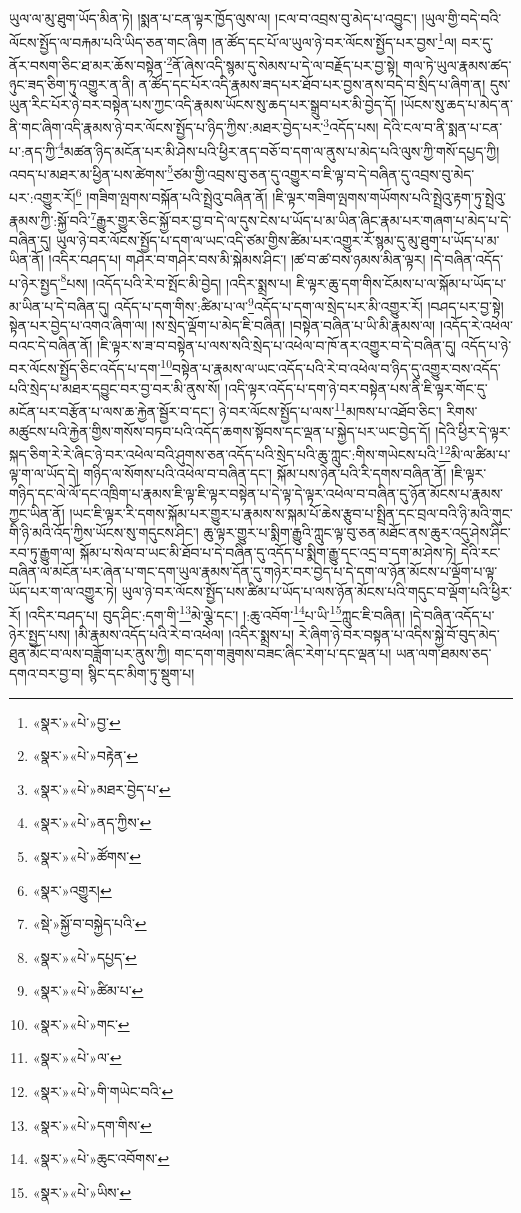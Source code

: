 ཡུལ་ལ་མུ་ཐུག་ཡོད་མིན་ཏེ། །སྨན་པ་ངན་ལྟར་ཁྱོད་ལུས་ལ། །ངལ་བ་འབྲས་བུ་མེད་པ་འབྱུང་། །ཡུལ་གྱི་བདེ་བའི་ལོངས་སྤྱོད་ལ་བརྐམ་པའི་ཡིད་ཅན་གང་ཞིག །ན་ཚོད་དང་པོ་ལ་ཡུལ་ཉེ་བར་ལོངས་སྤྱོད་པར་བྱས་\footnote{«སྣར་»«པེ་»བྱ་}ལ། བར་དུ་ནོར་བསག་ཅིང་ཐ་མར་ཆོས་བསྟེན་\footnote{«སྣར་»«པེ་»བརྟེན་}ནོ་ཞེས་འདི་སྙམ་དུ་སེམས་པ་དེ་ལ་བརྗོད་པར་བྱ་སྟེ། གལ་ཏེ་ཡུལ་རྣམས་ཚད་ཉུང་ཟད་ཅིག་ཏུ་འགྱུར་ན་ནི། ན་ཚོད་དང་པོར་འདི་རྣམས་ཟད་པར་ཐོབ་པར་བྱས་ནས་བདེ་བ་སྲིད་པ་ཞིག་ན། དུས་ཡུན་རིང་པོར་ཉེ་བར་བསྟེན་པས་ཀྱང་འདི་རྣམས་ཡོངས་སུ་ཆད་པར་སྒྲུབ་པར་མི་བྱེད་དོ། །ཡོངས་སུ་ཆད་པ་མེད་ན་ནི་གང་ཞིག་འདི་རྣམས་ཉེ་བར་ལོངས་སྤྱོད་པ་ཉིད་ཀྱིས་:མཐར་བྱེད་པར་\footnote{«སྣར་»«པེ་»མཐར་བྱེད་པ་}འདོད་པས། དེའི་ངལ་བ་ནི་སྨན་པ་ངན་པ་:ནད་ཀྱི་\footnote{«སྣར་»«པེ་»ནད་ཀྱིས་}མཚན་ཉིད་མངོན་པར་མི་ཤེས་པའི་ཕྱིར་ནད་བཅོ་བ་དག་ལ་ནུས་པ་མེད་པའི་ལུས་ཀྱི་གསོ་དཔྱད་ཀྱི། འབད་པ་མཐར་མ་ཕྱིན་པས་ཚེགས་\footnote{«སྣར་»«པེ་»ཚོགས་}ཙམ་གྱི་འབྲས་བུ་ཅན་དུ་འགྱུར་བ་ཇི་ལྟ་བ་དེ་བཞིན་དུ་འབྲས་བུ་མེད་པར་:འགྱུར་རོ།\footnote{«སྣར་»འགྱུར།} །གཟིག་ལྤགས་བསྐོན་པའི་སྤྲེའུ་བཞིན་ནོ། །ཇི་ལྟར་གཟིག་ལྤགས་གཡོགས་པའི་སྤྲེའུ་རྟག་ཏུ་སྤྲེའུ་རྣམས་ཀྱི་:སྐྱོ་བའི་\footnote{«སྡེ་»སྐྱོ་བ་བསྐྱེད་པའི་}རྒྱུར་གྱུར་ཅིང་སྐྱོ་བར་བྱ་བ་དེ་ལ་དུས་ངེས་པ་ཡོད་པ་མ་ཡིན་ཞིང་རྣམ་པར་གཞག་པ་མེད་པ་དེ་བཞིན་དུ། ཡུལ་ཉེ་བར་ལོངས་སྤྱོད་པ་དག་ལ་ཡང་འདི་ཙམ་གྱིས་ཚིམ་པར་འགྱུར་རོ་སྙམ་དུ་མུ་ཐུག་པ་ཡོད་པ་མ་ཡིན་ནོ། །འདིར་བཤད་པ། གཤེར་བ་གཤེར་བས་མི་སྐེམས་ཤིང་། །ཚ་བ་ཚ་བས་ཉམས་མིན་ལྟར། །དེ་བཞིན་འདོད་པ་ཉེར་སྤྱད་\footnote{«སྣར་»«པེ་»དཔྱད་}པས། །འདོད་པའི་རེ་བ་སྤོང་མི་བྱེད། །འདིར་སྨྲས་པ། ཇི་ལྟར་ཆུ་དག་གིས་ངོམས་པ་ལ་སྐོམ་པ་ཡོད་པ་མ་ཡིན་པ་དེ་བཞིན་དུ། འདོད་པ་དག་གིས་:ཚིམ་པ་ལ་\footnote{«སྣར་»«པེ་»ཚིམ་པ་}འདོད་པ་དག་ལ་སྲེད་པར་མི་འགྱུར་རོ། །བཤད་པར་བྱ་སྟེ། སྟེན་པར་བྱེད་པ་འགའ་ཞིག་ལ། །ས་སྲེད་ལྡོག་པ་མེད་ཇི་བཞིན། །བསྟེན་བཞིན་པ་ཡི་མི་རྣམས་ལ། །འདོད་རེ་འཕེལ་བའང་དེ་བཞིན་ནོ། །ཇི་ལྟར་ས་ཟ་བ་བསྟེན་པ་ལས་སའི་སྲེད་པ་འཕེལ་བ་ཁོ་ནར་འགྱུར་བ་དེ་བཞིན་དུ། འདོད་པ་ཉེ་བར་ལོངས་སྤྱོད་ཅིང་འདོད་པ་དག་\footnote{«སྣར་»«པེ་»གང་}བསྟེན་པ་རྣམས་ལ་ཡང་འདོད་པའི་རེ་བ་འཕེལ་བ་ཉིད་དུ་འགྱུར་བས་འདོད་པའི་སྲེད་པ་མཐར་དབྱུང་བར་བྱ་བར་མི་ནུས་སོ། །འདི་ལྟར་འདོད་པ་དག་ཉེ་བར་བསྟེན་པས་ནི་ཇི་ལྟར་གོང་དུ་མངོན་པར་བརྩོན་པ་ལས་ཆ་རྐྱེན་སྦྱོར་བ་དང་། ཉེ་བར་ལོངས་སྤྱོད་པ་ལས་\footnote{«སྣར་»«པེ་»ལ་}མཁས་པ་འཐོབ་ཅིང་། རིགས་མཚུངས་པའི་རྐྱེན་གྱིས་གསོས་བཏབ་པའི་འདོད་ཆགས་སྟོབས་དང་ལྡན་པ་སྐྱེད་པར་ཡང་བྱེད་དོ། །དེའི་ཕྱིར་དེ་ལྟར་སྐད་ཅིག་རེ་རེ་ཞིང་ཉེ་བར་འཕེལ་བའི་ཤུགས་ཅན་འདོད་པའི་སྲེད་པའི་ཆུ་ཀླུང་:གིས་གཡེངས་པའི་\footnote{«སྣར་»«པེ་»གི་གཡེང་བའི་}མི་ལ་ཚིམ་པ་ལྟ་ག་ལ་ཡོད་དེ། གཉིད་ལ་སོགས་པའི་འཕེལ་བ་བཞིན་དང་། སྐོམ་པས་ཉེན་པའི་རི་དགས་བཞིན་ནོ། །ཇི་ལྟར་གཉིད་དང་ལེ་ལོ་དང་འཁྲིག་པ་རྣམས་ཇི་ལྟ་ཇི་ལྟར་བསྟེན་པ་དེ་ལྟ་དེ་ལྟར་འཕེལ་བ་བཞིན་དུ་ཉོན་མོངས་པ་རྣམས་ཀྱང་ཡིན་ནོ། །ཡང་ཇི་ལྟར་རི་དགས་སྐོམ་པར་གྱུར་པ་རྣམས་ས་སྐམ་པོ་ཆེས་རྩུབ་པ་སྤྲིན་དང་བྲལ་བའི་ཉི་མའི་གུང་གི་ཉི་མའི་འོད་ཀྱིས་ཡོངས་སུ་གདུངས་ཤིང་། ཆུ་ལྟར་གྱུར་པ་སྨིག་རྒྱུའི་ཀླུང་ལྟ་བུ་ཅན་མཐོང་ནས་ཆུར་འདུ་ཤེས་ཤིང་རབ་ཏུ་རྒྱུག་ལ། སྐོམ་པ་སེལ་བ་ཡང་མི་ཐོབ་པ་དེ་བཞིན་དུ་འདོད་པ་སྨིག་རྒྱུ་དང་འདྲ་བ་དག་མ་ཤེས་ཏེ། དེའི་རང་བཞིན་ལ་མངོན་པར་ཞེན་པ་གང་དག་ཡུལ་རྣམས་དོན་དུ་གཉེར་བར་བྱེད་པ་དེ་དག་ལ་ཉོན་མོངས་པ་ལྡོག་པ་ལྟ་ཡོད་པར་ག་ལ་འགྱུར་ཏེ། ཡུལ་ཉེ་བར་ལོངས་སྤྱོད་པས་ཚིམ་པ་ཡོད་པ་ལས་ཉོན་མོངས་པའི་གདུང་བ་ལྡོག་པའི་ཕྱིར་རོ། །འདིར་བཤད་པ། བུད་ཤིང་:དག་གི་\footnote{«སྣར་»«པེ་»དག་གིས་}མེ་ལྕེ་དང་། །:ཆུ་འབོག་\footnote{«སྣར་»«པེ་»ཆུང་འབོགས་}པ་ཡི་\footnote{«སྣར་»«པེ་»ཡིས་}ཀླུང་ཇི་བཞིན། །དེ་བཞིན་འདོད་པ་ཉེར་སྤྱད་པས། །མི་རྣམས་འདོད་པའི་རེ་བ་འཕེལ། །འདིར་སྨྲས་པ། རེ་ཞིག་ཉེ་བར་བསྟན་པ་འདིས་སྐྱེ་བོ་བུད་མེད་ཐུན་མོང་བ་ལས་བཟློག་པར་ནུས་ཀྱི། གང་དག་གཟུགས་བཟང་ཞིང་རེག་པ་དང་ལྡན་པ། ཡན་ལག་ཐམས་ཅད་དགའ་བར་བྱ་བ། སྙིང་དང་མིག་ཏུ་སྡུག་པ། 
